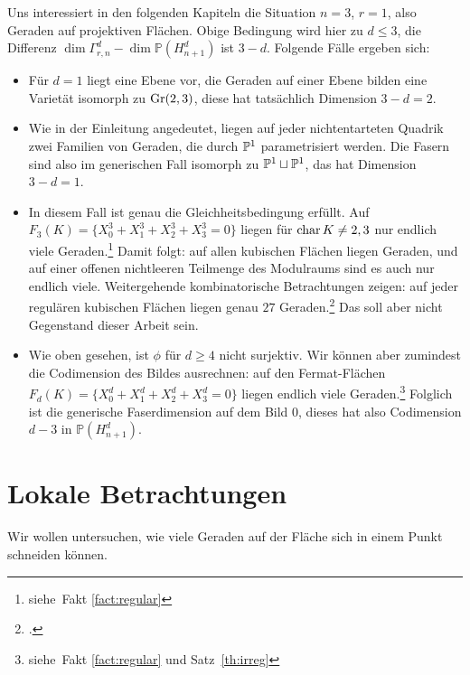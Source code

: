 Uns interessiert in den folgenden Kapiteln die Situation $n=3$, $r=1$, also Geraden auf projektiven Flächen. Obige Bedingung wird hier zu $d \leq 3$, die Differenz $\dim \Gamma_{r,n}^d - \dim \mathbb P(H_{n+1}^d)$ ist $3-d$. Folgende Fälle ergeben sich:
\begin{itemize}
\item Für $d=1$ liegt eine Ebene vor, die Geraden auf einer Ebene bilden eine Varietät isomorph zu $\grass 2/3$, diese hat tatsächlich Dimension $3-d = 2$.
\item Wie in der Einleitung angedeutet, liegen auf jeder nichtentarteten Quadrik zwei Familien von Geraden, die durch $\mathbb P^{1}$ parametrisiert werden. Die Fasern sind also im generischen Fall isomorph zu $\mathbb P^{1} \sqcup \mathbb P^{1}$, das hat Dimension $3-d = 1$.
\item In diesem Fall ist genau die Gleichheitsbedingung erfüllt. Auf $F_3(K) = \{X_0^3 + X_1^3 + X_2^3 + X_3^3 = 0\}$ liegen für $\operatorname{char} K \neq 2,3$ nur endlich viele Geraden.\footnote{siehe~Fakt \ref{fact:regular}} Damit folgt: auf allen kubischen Flächen liegen Geraden, und auf einer offenen nichtleeren Teilmenge des Modulraums sind es auch nur endlich viele. Weitergehende kombinatorische Betrachtungen zeigen: auf jeder regulären kubischen Flächen liegen genau $27$ Geraden.\footcite[siehe etwa][]{Henderson} Das soll aber nicht Gegenstand dieser Arbeit sein.
\item Wie oben gesehen, ist $\phi$ für $d \geq 4$ nicht surjektiv. Wir können aber zumindest die Codimension des Bildes ausrechnen: auf den Fermat-Flächen $F_d(K) = \{X_0^d + X_1^d + X_2^d + X_3^d = 0\}$ liegen endlich viele Geraden.\footnote{siehe~Fakt \ref{fact:regular} und Satz~\ref{th:irreg}} Folglich ist die generische Faserdimension auf dem Bild $0$, dieses hat also Codimension $d-3$ in $\mathbb P(H_{n+1}^d)$.
\end{itemize}

\section{Lokale Betrachtungen}
Wir wollen untersuchen, wie viele Geraden auf der Fläche sich in einem Punkt schneiden können.


